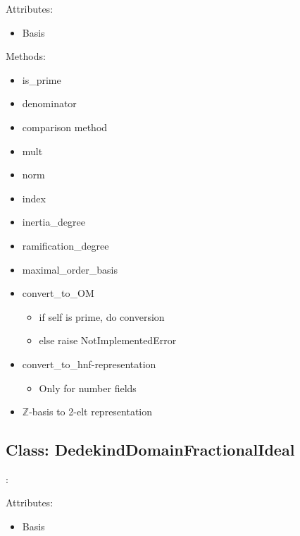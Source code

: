 \documentclass{amsart}
\theoremstyle{definition}
\begin{document}
	Attributes:
	\begin{itemize}
		\item 
		Basis
	\end{itemize}
	
	Methods:
	\begin{itemize}
		\item
		is\_prime
		\item
		denominator
		\item
		comparison method
		\item
		mult
		\item
		norm
		\item
		index
		\item
		inertia\_degree
		\item
		ramification\_degree
		\item
		maximal\_order\_basis
		\item
		convert\_to\_OM
			\begin{itemize}
				\item 
				if self is prime, do conversion
				\item
				else raise NotImplementedError
			\end{itemize}
		\item
		convert\_to\_hnf-representation
			\begin{itemize}
				\item 
				Only for number fields
			\end{itemize}
		\item
		$\mathbb{Z}$-basis to 2-elt representation
	\end{itemize}

	\subsection{Class: DedekindDomainFractionalIdeal}: \newline
	
	Attributes:
	\begin{itemize}
		\item 
		Basis
	\end{itemize}
	
\end{document}
